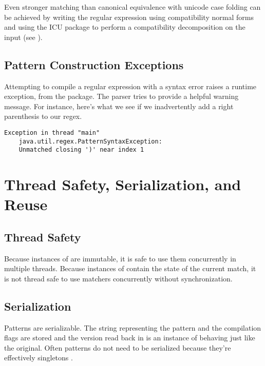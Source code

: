 Even stronger matching than canonical equivalence with unicode case
folding can be achieved by writing the regular expression using
compatibility normal forms and using the ICU package to perform a
compatibility decomposition on the input (see
).


\subsection{Pattern Construction Exceptions}

Attempting to compile a regular expression with a syntax error raises
a runtime exception,  from the
 package.  The parser tries to provide a helpful
warning message.  For instance, here's what we see if we inadvertently
add a right parenthesis to our regex.
%
%
\begin{verbatim}
Exception in thread "main" 
    java.util.regex.PatternSyntaxException:  
    Unmatched closing ')' near index 1
\end{verbatim}



\section{Thread Safety, Serialization, and Reuse}

\subsection{Thread Safety}

Because instances of  are immutable, it is safe to use
them concurrently in multiple threads.  Because instances of
 contain the state of the current match, it is not
thread safe to use matchers concurrently without synchronization.

\subsection{Serialization}

Patterns are serializable.  The string representing the pattern and
the compilation flags are stored and the version read back in is an
instance of  behaving just like the original.  Often
patterns do not need to be serialized because they're effectively
singletons .

